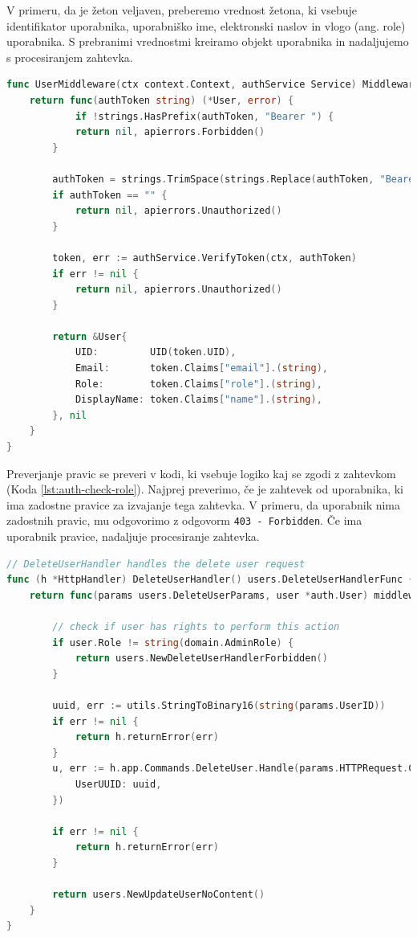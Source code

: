\documentclass[a4paper, 12pt]{book}
\begin{document}
V primeru, da je žeton veljaven, preberemo vrednost žetona, ki vsebuje identifikator uporabnika, uporabniško ime, elektronski naslov in vlogo (ang. role) uporabnika. S prebranimi vrednostmi kreiramo objekt uporabnika in nadaljujemo s procesiranjem zahtevka.

  \begin{lstlisting}[language=go,style=mystyle,caption={Izsek kode za preverjanje pristnosti uporabnika},label=lst:auth-middleware]
func UserMiddleware(ctx context.Context, authService Service) MiddlewareFunc {
	return func(authToken string) (*User, error) {
			if !strings.HasPrefix(authToken, "Bearer ") {
			return nil, apierrors.Forbidden()
		}

		authToken = strings.TrimSpace(strings.Replace(authToken, "Bearer", "", 1))
		if authToken == "" {
			return nil, apierrors.Unauthorized()
		}

		token, err := authService.VerifyToken(ctx, authToken)
		if err != nil {
			return nil, apierrors.Unauthorized()
		}
		
		return &User{
			UID:         UID(token.UID),
			Email:       token.Claims["email"].(string),
			Role:        token.Claims["role"].(string),
			DisplayName: token.Claims["name"].(string),
		}, nil
	}
}
\end{lstlisting}

Preverjanje pravic se preveri v kodi, ki vsebuje logiko kaj se zgodi z zahtevkom (Koda \ref{lst:auth-check-role}). Najprej preverimo, če je zahtevek od uporabnika, ki ima zadostne pravice za izvajanje tega zahtevka. V primeru, da uporabnik nima zadostnih pravic, mu odgovorimo z odgovorm \verb=403 - Forbidden=. Če ima uporabnik pravice, nadaljuje procesiranje zahtevka.

\clearpage
\begin{lstlisting}[language=go,style=mystyle,caption={Izsek kode za preverjanje pravic uporabnika},label=lst:auth-check-role]
// DeleteUserHandler handles the delete user request
func (h *HttpHandler) DeleteUserHandler() users.DeleteUserHandlerFunc {
	return func(params users.DeleteUserParams, user *auth.User) middleware.Responder {

		// check if user has rights to perform this action
		if user.Role != string(domain.AdminRole) {
			return users.NewDeleteUserHandlerForbidden()
		}

		uuid, err := utils.StringToBinary16(string(params.UserID))
		if err != nil {
			return h.returnError(err)
		}
		u, err := h.app.Commands.DeleteUser.Handle(params.HTTPRequest.Context(), command.DeleteParamsCmd{
			UserUUID: uuid,
		})

		if err != nil {
			return h.returnError(err)
		}

		return users.NewUpdateUserNoContent()
	}
}
\end{lstlisting}
\clearpage
\end{document}
